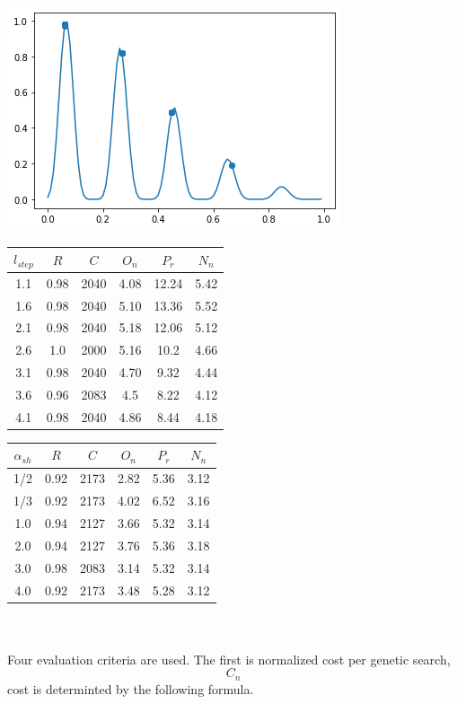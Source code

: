 \documentclass[smallextended]{svjour3}       %
\begin{document}
\begin{multicols}{2}
\begin{center}
  \includegraphics[width=\linewidth]{GA_images/example-transtandal-sin-result.png}
\end{center}



\begin{tabular}{cccccc}
	\toprule
    $l_{step}$ & $R$ & $C$ & $O_{n}$ & $P_{r}$ & $N_{n}$\\
	\midrule
    1.1 & 0.98 & 2040 & 4.08 & 12.24 & 5.42 \\
    1.6 & 0.98 & 2040 & 5.10 & 13.36 & 5.52 \\
    2.1 & 0.98 & 2040 & 5.18 & 12.06 & 5.12 \\
    2.6 & 1.0  & 2000 & 5.16 & 10.2 & 4.66 \\
    3.1 & 0.98 & 2040 & 4.70 & 9.32 & 4.44 \\
    3.6 & 0.96 & 2083 & 4.5  & 8.22 & 4.12 \\
    4.1 & 0.98 & 2040 & 4.86 & 8.44 & 4.18 \\
	\bottomrule
\end{tabular}

\begin{tabular}{cccccc}
	\toprule
    $\alpha_{sh}$ & $R$ & $C$ & $O_{n}$ & $P_{r}$ & $N_{n}$\\
	\midrule
    1/2 & 0.92 & 2173 & 2.82 & 5.36 & 3.12 \\
    1/3 & 0.92 & 2173 & 4.02 & 6.52 & 3.16 \\
    1.0 & 0.94 & 2127 & 3.66 & 5.32 & 3.14 \\
    2.0 & 0.94 & 2127 & 3.76 & 5.36 & 3.18 \\
    3.0 & 0.98 & 2083 & 3.14 & 5.32 & 3.14 \\
    4.0 & 0.92 & 2173 & 3.48 & 5.28 & 3.12 \\
	\bottomrule
\end{tabular}
\\
\\
Four evaluation criteria are used. 
The first is normalized cost per genetic search, $$C_{n}$$
cost is determinted by the following formula.



\end{multicols}
\end{document}
